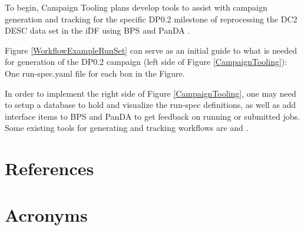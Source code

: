 \documentclass[DM,authoryear,toc]{lsstdoc}
\begin{document}
To begin, Campaign Tooling plans develop tools to assist with
campaign generation and tracking for the specific DP0.2 milestone 
of reprocessing the DC2 DESC data set in the iDF using BPS
and PanDA \cite{RTN-013}.  

Figure \ref{WorkflowExampleRunSet} can serve as an initial guide to
what is needed for generation of the DP0.2 campaign (left side of Figure 
\ref{CampaignTooling}): One run-spec.yaml file for each box in the Figure.  

In order to implement the right side of Figure \ref{CampaignTooling}, one may
need to setup a database to hold and visualize the run-spec definitions, 
as well as add interface items to BPS and PanDA to get feedback on running
or submitted jobs.  Some existing tools for generating and tracking 
workflows are \cite{airflow} and \cite{POMS}.

\appendix
\section{References} \label{sec:bib}
\renewcommand{\refname}{} %


\section{Acronyms} \label{sec:acronyms}

\end{document}
